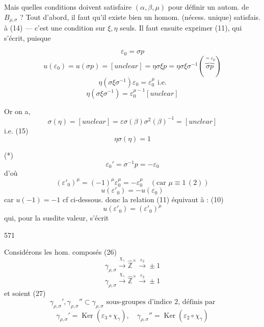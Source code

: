 \begin{enumerate}
Mais quelles conditions doivent satisfaire
$(\alpha, \beta, \mu)$ pour définir un autom. de $B_{\rho,\sigma}$ ?
Tout d'abord, il faut qu'il existe bien un
homom. (nécess. unique) satisfais. à
(14) — c'est une condition sur $\xi, \eta$ seuls.
Il faut ensuite exprimer (11), qui s'écrit, puisque

$$ \varepsilon_0 = \sigma p $$
$$ u(\varepsilon_0) = u(\sigma p) = [unclear] = \eta \sigma \xi p = \eta \sigma \xi \sigma^{-1} (\overbrace{\sigma p}^{= \varepsilon_0}) $$
$$ \eta (\sigma \xi \sigma^{-1}) \varepsilon_0 = \varepsilon_0^\mu \text{ i.e.} $$
$$ \eta (\sigma \xi \sigma^{-1}) = \varepsilon_0^{\mu-1} [unclear] $$

Or on a,
$$ \sigma(\eta) = [unclear] = \varepsilon \sigma(\beta) \sigma^2(\beta)^{-1} = [unclear] $$
i.e.
(15) $$ \eta \sigma(\eta) = 1 $$

(*)
$$ \varepsilon_0' = \sigma^{-1} p = - \varepsilon_0 $$
d'où
$$ (\varepsilon'_0)^\mu = (-1)^\mu \varepsilon_0^\mu = - \varepsilon_0^\mu \quad (\text{car } \mu \equiv 1 \, (2)) $$
$$ u(\varepsilon'_0) = - u(\varepsilon_0) $$ car $u(-1) = -1$ cf ci-dessous.
donc la relation (11) équivaut à :
(10) $$ u(\varepsilon'_0) = (\varepsilon'_0)^\mu $$
qui, pour la susdite valeur, s'écrit

\newpage



\newpage



\newpage


571

Considérons les hom. composés 
(26)
$$ \gamma_{\rho,\sigma} \xrightarrow{\chi_\gamma} \hat{\mathbb{Z}}^\times \xrightarrow{\varepsilon_2} \pm 1 $$
$$ \gamma_{\rho,\sigma} \xrightarrow{\chi_\gamma} \hat{\mathbb{Z}}^\times \xrightarrow{\varepsilon_3} \pm 1 $$
et soient 
(27)
$$ \gamma_{\rho,\sigma}', \gamma_{\rho,\sigma}'' \subset \gamma_{\rho,\sigma} \text{ sous-groupes d'indice 2, définis par} $$
$$ \gamma_{\rho,\sigma}' = \operatorname{Ker}(\varepsilon_3 \circ \chi_\gamma), \quad \gamma_{\rho,\sigma}'' = \operatorname{Ker}(\varepsilon_2 \circ \chi_\gamma) $$


\end{enumerate}
